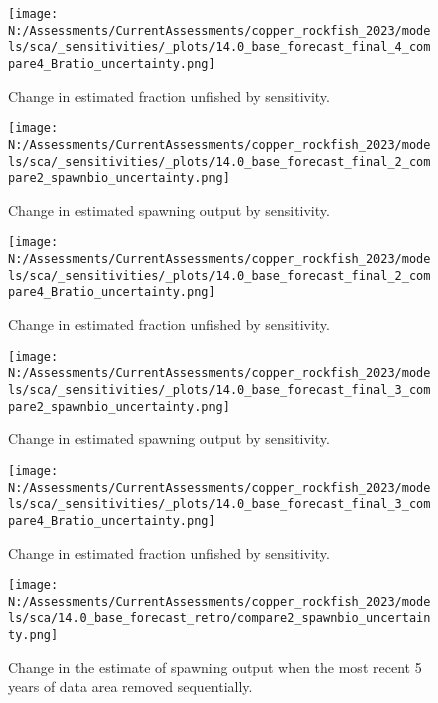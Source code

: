 \documentclass[11pt,
  english,
  letterpaper,
]{article}
\begin{document}
\newpage

\begin{figure}
\centering
\texttt{[image: N:/Assessments/CurrentAssessments/copper\_rockfish\_2023/models/sca/\_sensitivities/\_plots/14.0\_base\_forecast\_final\_4\_compare4\_Bratio\_uncertainty.png]}
\caption{Change in estimated fraction unfished by sensitivity.\label{fig:sens-depl-4}}
\end{figure}

\newpage

\begin{figure}
\centering
\texttt{[image: N:/Assessments/CurrentAssessments/copper\_rockfish\_2023/models/sca/\_sensitivities/\_plots/14.0\_base\_forecast\_final\_2\_compare2\_spawnbio\_uncertainty.png]}
\caption{Change in estimated spawning output by sensitivity.\label{fig:sens-ssb-2}}
\end{figure}

\newpage

\begin{figure}
\centering
\texttt{[image: N:/Assessments/CurrentAssessments/copper\_rockfish\_2023/models/sca/\_sensitivities/\_plots/14.0\_base\_forecast\_final\_2\_compare4\_Bratio\_uncertainty.png]}
\caption{Change in estimated fraction unfished by sensitivity.\label{fig:sens-depl-2}}
\end{figure}

\newpage

\begin{figure}
\centering
\texttt{[image: N:/Assessments/CurrentAssessments/copper\_rockfish\_2023/models/sca/\_sensitivities/\_plots/14.0\_base\_forecast\_final\_3\_compare2\_spawnbio\_uncertainty.png]}
\caption{Change in estimated spawning output by sensitivity.\label{fig:sens-ssb-3}}
\end{figure}

\newpage

\begin{figure}
\centering
\texttt{[image: N:/Assessments/CurrentAssessments/copper\_rockfish\_2023/models/sca/\_sensitivities/\_plots/14.0\_base\_forecast\_final\_3\_compare4\_Bratio\_uncertainty.png]}
\caption{Change in estimated fraction unfished by sensitivity.\label{fig:sens-depl-3}}
\end{figure}

\newpage

\begin{figure}
\centering
\texttt{[image: N:/Assessments/CurrentAssessments/copper\_rockfish\_2023/models/sca/14.0\_base\_forecast\_retro/compare2\_spawnbio\_uncertainty.png]}
\caption{Change in the estimate of spawning output when the most recent 5 years of data area removed sequentially.\label{fig:retro-ssb}}
\end{figure}
\end{document}
